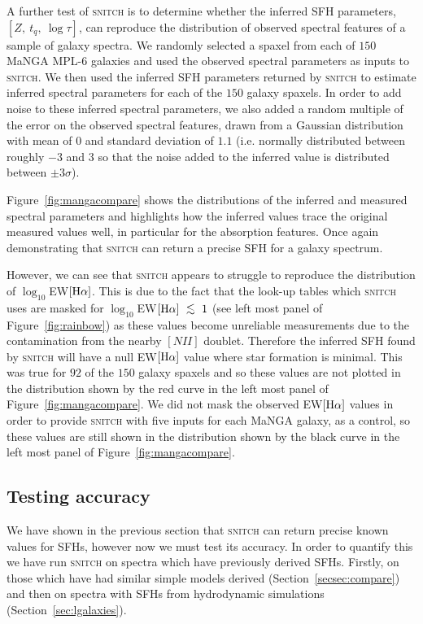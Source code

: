 \documentclass[useAMS,usenatbib]{mn2e}
\def\lesssim{\mathrel{\hbox{\rlap{\hbox{\lower3pt\hbox{$\sim$}}}\hbox{\raise2pt\hbox{$<$}}}}}
\begin{document}
A further test of \textsc{snitch} is to determine whether the inferred SFH parameters, $[Z,~t_q,~\log\tau]$, can reproduce the distribution of observed spectral features of a sample of galaxy spectra. We randomly selected a spaxel from each of $150$ MaNGA MPL-6 galaxies  and used the observed spectral parameters as inputs to \textsc{snitch}. We then used the inferred SFH parameters returned by \textsc{snitch} to estimate inferred spectral parameters for each of the $150$ galaxy spaxels. In order to add noise to these inferred spectral parameters, we also added a random multiple of the error on the observed spectral features, drawn from a Gaussian distribution with mean of $0$ and standard deviation of $1.1$ (i.e. normally distributed between roughly $-3$ and $3$ so that the noise added to the inferred value is distributed between $\pm3\sigma$).

Figure~\ref{fig:mangacompare} shows the distributions of the inferred and measured spectral parameters and highlights how the inferred values trace the original measured values well, in particular for the absorption features. Once again demonstrating that \textsc{snitch} can return a precise SFH for a galaxy spectrum. 

However, we can see that \textsc{snitch} appears to struggle to reproduce the distribution of $\log_{10}$EW$[\rm{H}\alpha]$. This is due to the fact that the look-up tables which \textsc{snitch} uses are masked for $\log_{10}$EW$[\rm{H}\alpha]~\lesssim~1$ (see left most panel of Figure~\ref{fig:rainbow}) as these values become unreliable measurements due to the contamination from the nearby $[NII]$ doublet. Therefore the inferred SFH found by \textsc{snitch} will have a null EW$[\rm{H}\alpha]$ value where star formation is minimal. This was true for $92$ of the $150$ galaxy spaxels and so these values are not plotted in the distribution shown by the red curve in the left most panel of Figure~\ref{fig:mangacompare}. We did not mask the observed EW$[\rm{H}\alpha]$ values in order to provide \textsc{snitch} with five inputs for each MaNGA galaxy, as a control, so these values are still shown in the distribution shown by the black curve in the left most panel of Figure~\ref{fig:mangacompare}. 

\subsection{Testing accuracy}\label{sec:accuracytest}

We have shown in the previous section that \textsc{snitch} can return precise known values for SFHs, however now we must test its accuracy. In order to quantify this we have run \textsc{snitch} on spectra which have previously derived SFHs. Firstly, on those which have had similar simple models derived (Section~\ref{secsec:compare}) and then on spectra with SFHs from hydrodynamic simulations (Section~\ref{sec:lgalaxies}).
\end{document}
